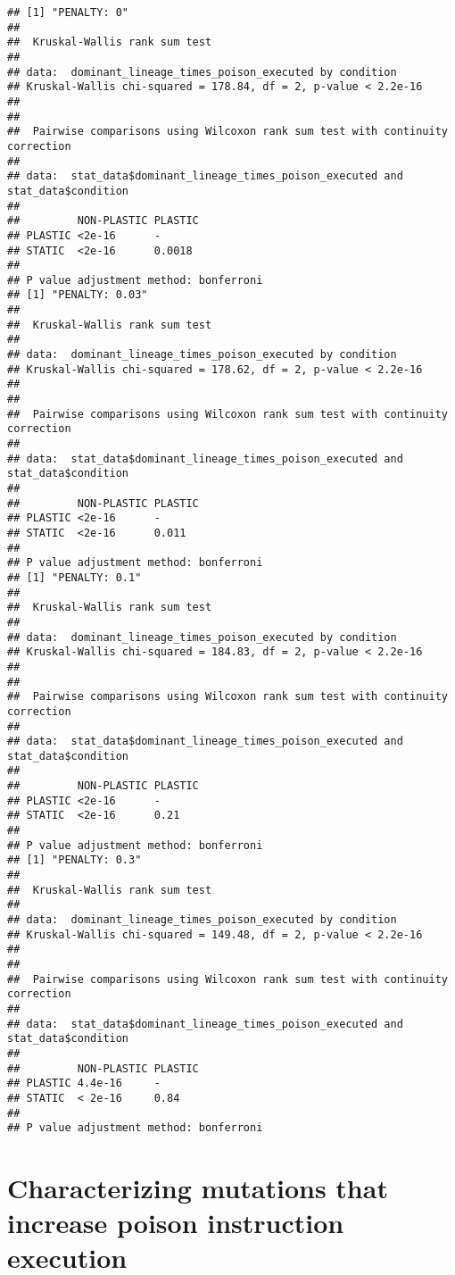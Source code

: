 \documentclass[]{book}
\begin{document}
\begin{verbatim}
## [1] "PENALTY: 0"
## 
##  Kruskal-Wallis rank sum test
## 
## data:  dominant_lineage_times_poison_executed by condition
## Kruskal-Wallis chi-squared = 178.84, df = 2, p-value < 2.2e-16
## 
## 
##  Pairwise comparisons using Wilcoxon rank sum test with continuity correction 
## 
## data:  stat_data$dominant_lineage_times_poison_executed and stat_data$condition 
## 
##         NON-PLASTIC PLASTIC
## PLASTIC <2e-16      -      
## STATIC  <2e-16      0.0018 
## 
## P value adjustment method: bonferroni 
## [1] "PENALTY: 0.03"
## 
##  Kruskal-Wallis rank sum test
## 
## data:  dominant_lineage_times_poison_executed by condition
## Kruskal-Wallis chi-squared = 178.62, df = 2, p-value < 2.2e-16
## 
## 
##  Pairwise comparisons using Wilcoxon rank sum test with continuity correction 
## 
## data:  stat_data$dominant_lineage_times_poison_executed and stat_data$condition 
## 
##         NON-PLASTIC PLASTIC
## PLASTIC <2e-16      -      
## STATIC  <2e-16      0.011  
## 
## P value adjustment method: bonferroni 
## [1] "PENALTY: 0.1"
## 
##  Kruskal-Wallis rank sum test
## 
## data:  dominant_lineage_times_poison_executed by condition
## Kruskal-Wallis chi-squared = 184.83, df = 2, p-value < 2.2e-16
## 
## 
##  Pairwise comparisons using Wilcoxon rank sum test with continuity correction 
## 
## data:  stat_data$dominant_lineage_times_poison_executed and stat_data$condition 
## 
##         NON-PLASTIC PLASTIC
## PLASTIC <2e-16      -      
## STATIC  <2e-16      0.21   
## 
## P value adjustment method: bonferroni 
## [1] "PENALTY: 0.3"
## 
##  Kruskal-Wallis rank sum test
## 
## data:  dominant_lineage_times_poison_executed by condition
## Kruskal-Wallis chi-squared = 149.48, df = 2, p-value < 2.2e-16
## 
## 
##  Pairwise comparisons using Wilcoxon rank sum test with continuity correction 
## 
## data:  stat_data$dominant_lineage_times_poison_executed and stat_data$condition 
## 
##         NON-PLASTIC PLASTIC
## PLASTIC 4.4e-16     -      
## STATIC  < 2e-16     0.84   
## 
## P value adjustment method: bonferroni
\end{verbatim}

\hypertarget{characterizing-mutations-that-increase-poison-instruction-execution}{%
\section{Characterizing mutations that increase poison instruction execution}\label{characterizing-mutations-that-increase-poison-instruction-execution}}
\end{document}
